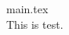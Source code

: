 \documentclass[10pt,a4j,report]{jsarticle}
\begin{document}
main.tex\\

This is test.
\end{document}
